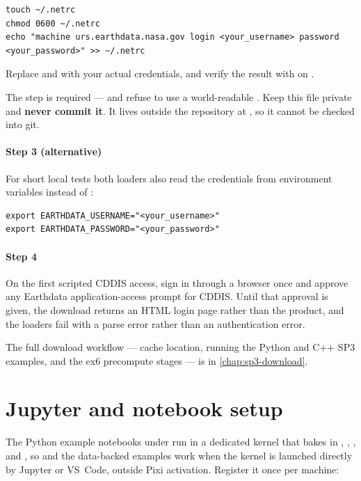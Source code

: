 \begin{lstlisting}[language=shell]
touch ~/.netrc
chmod 0600 ~/.netrc
echo "machine urs.earthdata.nasa.gov login <your_username> password <your_password>" >> ~/.netrc
\end{lstlisting}

Replace  and  with your actual
credentials, and verify the result with  on .

\begin{lupntwarning}
The  step is required ---  and  refuse
to use a world-readable . Keep this file private and
\textbf{never commit it}. It lives outside the repository at ,
so it cannot be checked into git.
\end{lupntwarning}

\paragraph{Step 3 (alternative)}
For short local tests both loaders also read the credentials from environment
variables instead of :

\begin{lstlisting}[language=shell]
export EARTHDATA_USERNAME="<your_username>"
export EARTHDATA_PASSWORD="<your_password>"
\end{lstlisting}

\paragraph{Step 4}
On the first scripted CDDIS access, sign in through a browser once and approve
any Earthdata application-access prompt for CDDIS. Until that approval is
given, the download returns an HTML login page rather than the product, and the
loaders fail with a parse error rather than an authentication error.

The full download workflow --- cache location, running the Python and C++ SP3
examples, and the ex6 precompute stages --- is in \cref{chap:sp3-download}.

\section{Jupyter and notebook setup}
\label{sec:gs-jupyter}

The Python example notebooks under  run in a dedicated
kernel that bakes in , ,
, and , so
 and the data-backed examples work when the kernel is
launched directly by Jupyter or VS~Code, outside Pixi activation. Register it
once per machine:

